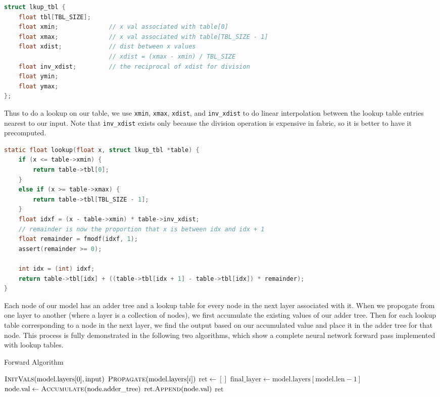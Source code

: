 \documentclass{article}
\begin{document}
\begin{lstlisting}[language=C]
struct lkup_tbl {
    float tbl[TBL_SIZE];
    float xmin;              // x val associated with table[0]
    float xmax;              // x val associated with table[TBL_SIZE - 1]
    float xdist;             // dist between x values 
                             // xdist = (xmax - xmin) / TBL_SIZE
    float inv_xdist;         // the reciprocal of xdist for division
    float ymin;
    float ymax;
};
\end{lstlisting}

Thus to do a lookup on our table, we use \texttt{xmin}, \texttt{xmax}, \texttt{xdist}, and \texttt{inv\_xdist} to do linear interpolation between the lookup table entries nearest to our input. Note that \texttt{inv\_xdist} exists only because the division operation is expensive in fabric, so it is better to have it precomputed.

\begin{lstlisting}[language=C]
static float lookup(float x, struct lkup_tbl *table) {
    if (x <= table->xmin) {
        return table->tbl[0];
    }
    else if (x >= table->xmax) {
        return table->tbl[TBL_SIZE - 1];
    }
    float idxf = (x - table->xmin) * table->inv_xdist;
    // remainder is now the proportion that x is between idx and idx + 1
    float remainder = fmodf(idxf, 1);
    assert(remainder >= 0);

    int idx = (int) idxf;
    return table->tbl[idx] + ((table->tbl[idx + 1] - table->tbl[idx]) * remainder);
}
\end{lstlisting}

Each node of our model has an adder tree and a lookup table for every node in the next layer associated with it. When we propogate from one layer to another (where a layer is a collection of nodes), we first accumulate the existing values of our adder tree. Then for each lookup table corresponding to a node in the next layer, we find the output based on our accumulated value and place it in the adder tree for that node. This process is fully demonstrated in the following two algorithms, which show a complete neural network forward pass implemented with lookup tables.

\begin{algorithm}[H]
    \caption{Forward Algorithm}
    \label{alg:forward}
    \begin{algorithmic}[1]
            \State $\Call{InitVals}{\text{model}.\text{layers}[0], \text{input}}$
                \State $\Call{Propagate}{\text{model}.\text{layers}[i]}$
            \EndFor
            \State $\text{ret} \gets []$
            \State $\text{final\_layer} \gets \text{model}.\text{layers}[\text{model}.\text{len} - 1]$
                \State $\text{node}.\text{val} \gets \Call{Accumulate}{\text{node}.\text{adder\_tree}}$
                \State $\text{ret}.\Call{Append}{\text{node}.\text{val}}$
            \EndFor
            \State \Return $\text{ret}$
        \EndFunction
    \end{algorithmic}
\end{algorithm}
\end{document}
